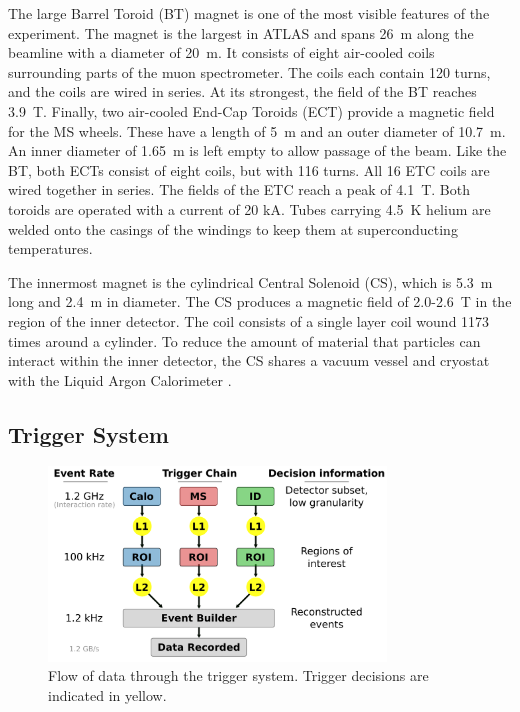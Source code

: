 The large Barrel Toroid (BT) magnet is one of the most visible features of the experiment.
The magnet is the largest in ATLAS and spans 26~m along the beamline with a diameter of 20~m.
It consists of eight air-cooled coils surrounding parts of the muon spectrometer.
The coils each contain 120 turns, and the coils are wired in series.
At its strongest, the field of the BT reaches 3.9~T.
Finally, two air-cooled End-Cap Toroids (ECT) provide a magnetic field for the MS wheels.
These have a length of 5~m and an outer diameter of 10.7~m. An inner diameter of 1.65~m is left empty to allow passage of the beam.
Like the BT, both ECTs consist of eight coils, but with 116 turns.
All 16 ETC coils are wired together in series.
The fields of the ETC reach a peak of 4.1~T.
Both toroids are operated with a current of 20 kA.
Tubes carrying 4.5~K helium are welded onto the casings of the windings to keep them at superconducting temperatures.

The innermost magnet is the cylindrical Central Solenoid (CS), which is 5.3~m long and 2.4~m in diameter.
The CS produces a magnetic field of 2.0-2.6~T in the region of the inner detector.
The coil consists of a single layer coil wound 1173 times around a cylinder.
To reduce the amount of material that particles can interact within the inner detector, the CS shares a vacuum vessel and cryostat with the Liquid Argon Calorimeter  \cite{magnetTdr}.

\subsection{Trigger System}

\begin{figure}[h!]
\captionsetup[subfigure]{position=b}
\centering
\includegraphics[width=0.8\textwidth]{figures/experiment/atlas/trigger.pdf}
\caption{Flow of data through the trigger system. Trigger decisions are indicated in yellow.}
\label{fig:atlasTrigger}
\end{figure}

